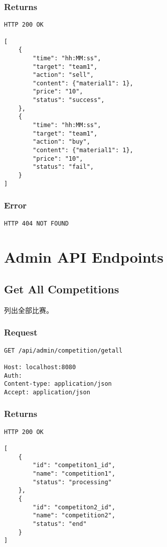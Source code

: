 \documentclass{article}
\begin{document}
\subsubsection*{Returns}
\begin{lstlisting}
HTTP 200 OK

[
	{
	    "time": "hh:MM:ss",
	    "target": "team1",
        "action": "sell",
	    "content": {"material1": 1},
        "price": "10",
	    "status": "success",
	},
	{
	    "time": "hh:MM:ss",
	    "target": "team1",
        "action": "buy",
	    "content": {"material1": 1},
        "price": "10",
	    "status": "fail",
	}
]
\end{lstlisting}

\subsubsection*{Error}
\begin{lstlisting}
HTTP 404 NOT FOUND
\end{lstlisting}






\section{Admin API Endpoints}
\subsection{Get All Competitions}

列出全部比赛。

\subsubsection*{Request}
\begin{lstlisting}
GET /api/admin/competition/getall

Host: localhost:8080
Auth:
Content-type: application/json
Accept: application/json
\end{lstlisting}

\subsubsection*{Returns}
\begin{lstlisting}
HTTP 200 OK

[
	{
	    "id": "competiton1_id",
	    "name": "competition1",
	    "status": "processing"
	},
	{
	    "id": "competiton2_id",
	    "name": "competition2",
	    "status": "end"
	}
]
\end{lstlisting}
\end{document}
